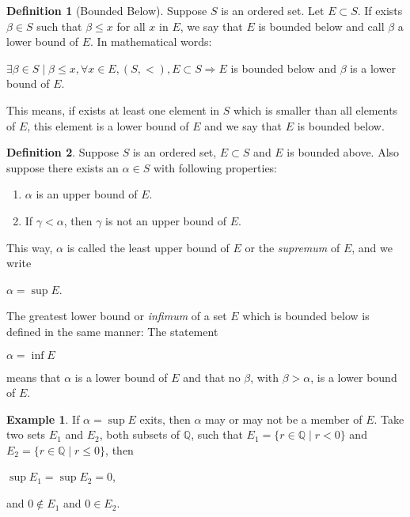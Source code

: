 \documentclass[11pt, a4paper]{amsart}
\numberwithin{equation}{section}
\theoremstyle{plain} %
\theoremstyle{definition}
\newtheorem{defn}{Definition}[section]
\newtheorem{ex}{Example}[section]
\theoremstyle{remark}
\begin{document}
\begin{defn}[Bounded Below]
Suppose $S$ is an ordered set. Let $E\subset S$. If exists $\beta \in S$ such that $\beta\leq x$ for all $x$ in $E$, we say that $E$ is bounded below and call $\beta$ a lower bound of $E$. In mathematical words:

\begin{center}
    $\exists \beta\in S \mid \beta\leq x, \forall x\in E,(S,<),E\subset S\Rightarrow E$ is bounded below and $\beta$ is a lower bound of $E$.
\end{center}
\end{defn}
This means, if exists at least one element in $S$ which is smaller than all elements of $E$, this element is a lower bound of $E$ and we say that $E$ is bounded below.

\begin{defn}
Suppose $S$ is an ordered set, $E\subset S$ and $E$ is bounded above. Also suppose there exists an $\alpha\in S$ with following properties:

\begin{enumerate}
    \item $\alpha$ is an upper bound of $E$.
    \item If $\gamma<\alpha$, then $\gamma$ is not an upper bound of $E$.
\end{enumerate}

This way, $\alpha$ is called the least upper bound of $E$ or the \textit{supremum} of $E$, and we write
\begin{center}
    $\alpha=\sup E$.
\end{center}

The greatest lower bound or \textit{infimum} of a set $E$ which is bounded below is defined in the same manner: The statement
\begin{center}
    $\alpha=\inf E$
\end{center}

means that $\alpha$ is a lower bound of $E$ and that no $\beta$, with $\beta>\alpha$, is a lower bound of $E$.
\end{defn}

\begin{ex}
If $\alpha=\sup E$ exits, then $\alpha$ may or may not be a member of $E$. Take two sets $E_1$ and $E_2$, both subsets of $\mathbb{Q}$, such that $E_1=\{r\in\mathbb{Q}\mid r<0\}$ and $E_2=\{r\in \mathbb{Q}\mid r\leq 0\}$, then
    \begin{center}
        $\sup E_1=\sup E_2=0$,
    \end{center}
    and $0\notin E_1$ and $0\in E_2$.
\end{ex}
\end{document}

